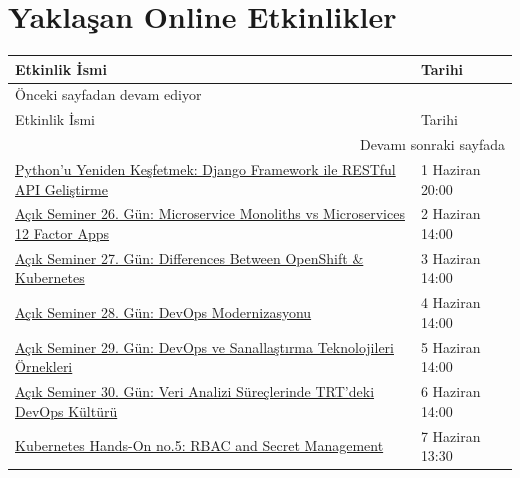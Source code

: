 \documentclass[11pt]{article}
\begin{document}
\section{Yaklaşan Online Etkinlikler}
\label{sec:orgbcb5b28}
\begin{longtable}{|p{9.5cm}|l|}
\hline
Etkinlik İsmi & Tarihi\\
\hline
\endfirsthead
\multicolumn{2}{l}{Önceki sayfadan devam ediyor} \\
\hline

Etkinlik İsmi & Tarihi \\

\hline
\endhead
\hline\multicolumn{2}{r}{Devamı sonraki sayfada} \\
\endfoot
\endlastfoot
\hline
\href{https://kommunity.com/devnot-yazilimci-bulusmalari/events/pythonu-yeniden-kesfetmek-django-framework-ile-restful-api-gelistirme-0456cd39}{Python'u Yeniden Keşfetmek: Django Framework ile RESTful API Geliştirme} & 1 Haziran 20:00\\
\href{https://kommunity.com/tracikkaynak/events/acik-seminer-26-gun-microservice-monoliths-vs-microservices-12-factor-apps-b27a33e1}{Açık Seminer 26. Gün: Microservice Monoliths vs Microservices 12 Factor Apps} & 2 Haziran 14:00\\
\href{https://kommunity.com/tracikkaynak/events/acik-seminer-27-gun-differences-between-openshift-kubernetes-3a8d8109}{Açık Seminer 27. Gün: Differences Between OpenShift \& Kubernetes} & 3 Haziran 14:00\\
\href{https://kommunity.com/tracikkaynak/events/acik-seminer-28-gun-0401f590}{Açık Seminer 28. Gün: DevOps Modernizasyonu} & 4 Haziran 14:00\\
\href{https://kommunity.com/tracikkaynak/events/acik-seminer-29-gun-devops-ve-sanallastirma-teknolojileri-ornekleri-94d0ef9f}{Açık Seminer 29. Gün: DevOps ve Sanallaştırma Teknolojileri Örnekleri} & 5 Haziran 14:00\\
\href{https://kommunity.com/tracikkaynak/events/acik-seminer-30-gun-80c296da}{Açık Seminer 30. Gün: Veri Analizi Süreçlerinde TRT'deki DevOps Kültürü} & 6 Haziran 14:00\\
\href{https://kommunity.com/cloud-and-serverless-turkey/events/kubernetes-hands-on-5-rbac-and-secret-management-280ed399}{Kubernetes Hands-On no.5: RBAC and Secret Management} & 7 Haziran 13:30\\
\hline
\end{longtable}
\end{document}
